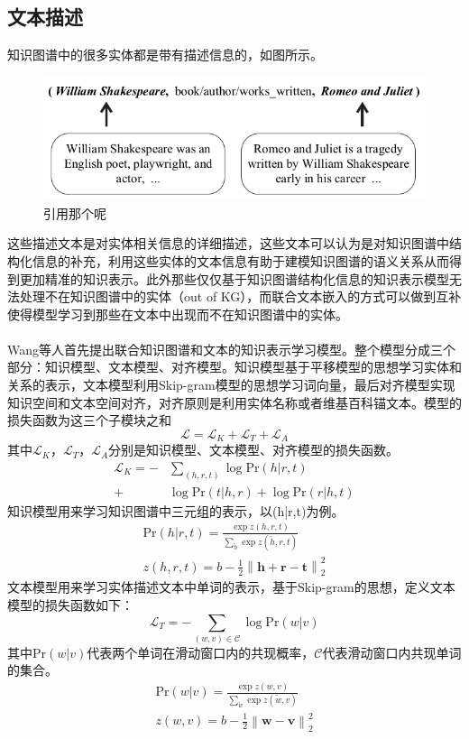 \documentclass[twocolumn]{article}
\newcommand{\upcite}[1]{\textsuperscript{\textsuperscript{\cite{#1}}}}
\begin{document}
\subsection{文本描述}
	知识图谱中的很多实体都是带有描述信息的，如图所示。
	\begin{figure}[ht]
		\centering
		\includegraphics[width=0.8\linewidth]{dkrl.png}
		\caption{引用那个呢}
\end{figure}
	这些描述文本是对实体相关信息的详细描述，这些文本可以认为是对知识图谱中结构化信息的补充，利用这些实体的文本信息有助于建模知识图谱的语义关系从而得到更加精准的知识表示。此外那些仅仅基于知识图谱结构化信息的知识表示模型无法处理不在知识图谱中的实体（out of KG），而联合文本嵌入的方式可以做到互补使得模型学习到那些在文本中出现而不在知识图谱中的实体。
	
	Wang等人\upcite{Wang}首先提出联合知识图谱和文本的知识表示学习模型。整个模型分成三个部分：知识模型、文本模型、对齐模型。知识模型基于平移模型的思想学习实体和关系的表示，文本模型利用Skip-gram模型的思想学习词向量，最后对齐模型实现知识空间和文本空间对齐，对齐原则是利用实体名称或者维基百科锚文本。模型的损失函数为这三个子模块之和
	\begin{equation}
	\mathcal{L}=\mathcal{L}_K+\mathcal{L}_T+\mathcal{L}_A
	\end{equation}
	其中$\mathcal{L}_K$，$\mathcal{L}_T$，$\mathcal{L}_A$分别是知识模型、文本模型、对齐模型的损失函数。
	\begin{equation}
	\begin{split}
		\mathcal{L}_K=-&\sum_{(h,r,t)}\log \text{Pr}(h|r,t) \\
		+& \log \text{Pr}(t|h,r)+\log \text{Pr}(r|h,t)
	\end{split}
	\end{equation}
	知识模型用来学习知识图谱中三元组的表示，以(h|r,t)为例。
	\begin{gather}
		\text{Pr}(h|r,t)=\frac{\exp{z(h,r,t)}}{\sum_{\widetilde{h}}\exp{z(\widetilde{h},r,t)}} \\
		z(h,r,t)=b-\frac{1}{2}\left \| \textbf{h}+\textbf{r}-\textbf{t} \right \|_2^2
	\end{gather}
	文本模型用来学习实体描述文本中单词的表示，基于Skip-gram的思想，定义文本模型的损失函数如下：
	\begin{equation}
		\mathcal{L}_T=-\sum_{(w,v)\in \mathcal{C}}\log \text{Pr}(w|v)
	\end{equation}
	其中$\text{Pr}(w|v)$代表两个单词在滑动窗口内的共现概率，$\mathcal{C}$代表滑动窗口内共现单词的集合。
	\begin{gather}
	\text{Pr}(w|v)=\frac{\exp{z(w,v)}}{\sum_{\widetilde{w}}\exp{z(\widetilde{w},v)}} \\
	z(w,v)=b-\frac{1}{2}\left \|\textbf{w}-\textbf{v}  \right \|_2^2
	\end{gather}
	
\end{document}
